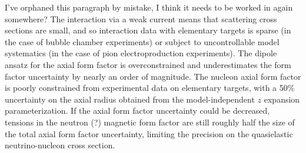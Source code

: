 {\color{blue} I've orphaned this paragraph by mistake, I think it needs to be worked in again somewhere?}
The interaction via a weak current means that scattering cross sections are small,
 and so interaction data with elementary targets is sparse
 (in the case of bubble chamber experiments)
 or subject to uncontrollable model systematics
 (in the case of pion electroproduction experiments).
The dipole ansatz for the axial form factor is overconstrained
 and underestimates the form factor uncertainty by nearly an order of magnitude.
The nucleon axial form factor is poorly constrained from experimental data
 on elementary targets, with a 50\% uncertainty on the axial radius
 obtained from the model-independent $z$ expansion parameterization.
If the axial form factor uncertainty could be decreased,
 tensions in the neutron (?) magnetic form factor are still
 roughly half the size of the total axial form factor uncertainty,
 limiting the precision on the quasielastic neutrino-nucleon cross section.
